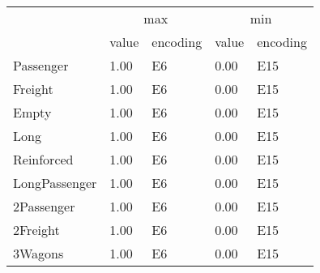 \begin{tabular}{lllll}
\toprule
 & \multicolumn{2}{c}{max} & \multicolumn{2}{c}{min} \\
 & value & encoding & value & encoding \\
\midrule
Passenger & 1.00 & E6 & 0.00 & E15 \\
Freight & 1.00 & E6 & 0.00 & E15 \\
Empty & 1.00 & E6 & 0.00 & E15 \\
Long & 1.00 & E6 & 0.00 & E15 \\
Reinforced & 1.00 & E6 & 0.00 & E15 \\
LongPassenger & 1.00 & E6 & 0.00 & E15 \\
2Passenger & 1.00 & E6 & 0.00 & E15 \\
2Freight & 1.00 & E6 & 0.00 & E15 \\
3Wagons & 1.00 & E6 & 0.00 & E15 \\
\bottomrule
\end{tabular}

